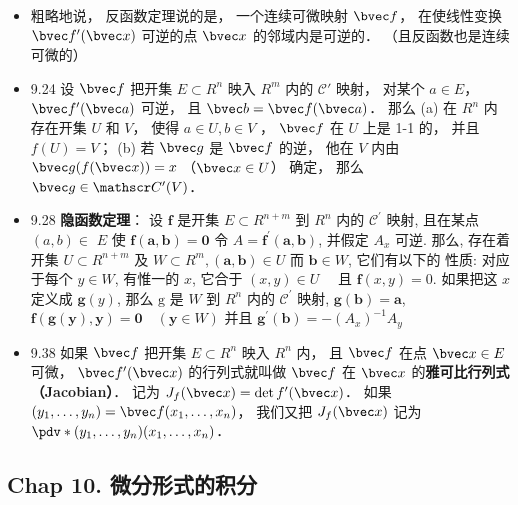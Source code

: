 \begin{itemize}
\item 粗略地说， 反函数定理说的是， 一个连续可微映射 $\bvec f$， 在使线性变换 $\bvec f'(\bvec x)$ 可逆的点 $\bvec x$ 的邻域内是可逆的． （且反函数也是连续可微的）

\item 9.24 设 $\bvec f$ 把开集 $E\subset R^n$ 映入 $R^m$ 内的 $\mathscr C'$ 映射， 对某个 $a\in E$， $\bvec f'(\bvec a)$ 可逆， 且 $\bvec b = \bvec f(\bvec a)$． 那么 (a) 在 $R^n$ 内存在开集 $U$ 和 $V$， 使得 $a\in U, b\in V$ ， $\bvec f$ 在 $U$ 上是 1-1 的， 并且 $f(U) = V$； (b) 若 $\bvec g$ 是 $\bvec f$ 的逆， 他在 $V$ 内由 $\bvec g(f(\bvec x)) = x$ （$\bvec x\in U$） 确定， 那么 $\bvec g\in \mathscr C'(V)$．

\item 9.28 \textbf{隐函数定理}： 设 $\mathbf{f}$ 是开集 $E \subset R^{n+m}$ 到 $R^{n}$ 内的 $\mathscr{C}^{\prime}$ 映射, 且在某点 $(a, b) \in$ $E$ 使 $\mathbf{f}(\boldsymbol{a}, \boldsymbol{b})=\mathbf{0}$
令 $A=\mathbf{f}^{\prime}(\boldsymbol{a}, \boldsymbol{b})$, 并假定 $A_{x}$ 可逆.
那么, 存在着开集 $U \subset R^{n+m}$ 及 $W \subset R^{m},(\boldsymbol{a}, \boldsymbol{b}) \in U$ 而 $\boldsymbol{b} \in W$, 它们有以下的 性质:
对应于每个 $y \in W$, 有惟一的 $x$, 它合于 $(x, y) \in U \quad$ 且 $\mathbf{f}(x, y)=0$.
如果把这 $x$ 定义成 $\mathbf{g}(y)$, 那么 $\mathrm{g}$ 是 $W$ 到 $R^{n}$ 内的 $\mathscr{C}^{\prime}$ 映射, $\mathbf{g}(\boldsymbol{b})=\boldsymbol{a}$, $\mathbf{f}(\mathbf{g}(\boldsymbol{y}), \boldsymbol{y})=\mathbf{0} \quad(\boldsymbol{y} \in W)$ 并且
$\mathbf{g}^{\prime}(\boldsymbol{b})=-\left(A_{x}\right)^{-1} A_{y}$

\item 9.38 如果 $\bvec f$ 把开集 $E\subset R^n$ 映入 $R^n$ 内， 且 $\bvec f$ 在点 $\bvec x\in E$ 可微， $\bvec f'(\bvec x)$ 的行列式就叫做 $\bvec f$ 在 $\bvec x$ 的\textbf{雅可比行列式（Jacobian）}． 记为 $J_f(\bvec x) = \det f'(\bvec x)$． 如果 $(y_1,\dots,y_n)=\bvec f(x_1,\dots, x_n)$， 我们又把 $J_f(\bvec x)$ 记为 $\pdv*{(y_1,\dots,y_n)}{(x_1,\dots, x_n)}$．
\end{itemize}

\subsection{Chap 10. 微分形式的积分}

